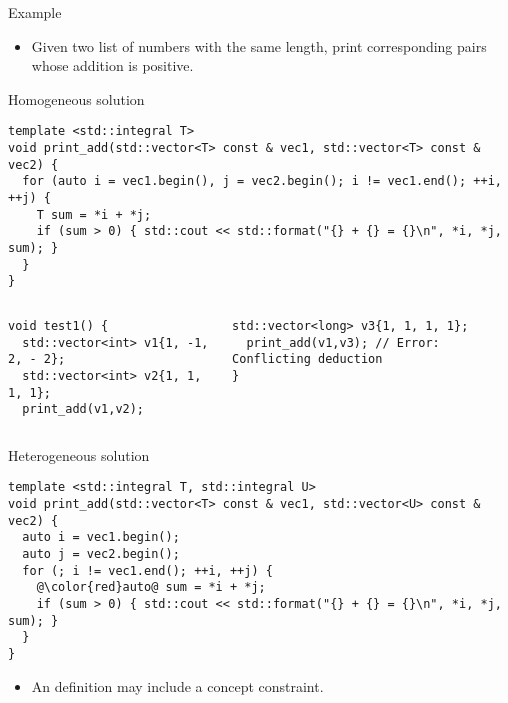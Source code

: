 \begin{frame}[t,fragile]{Example}
  \begin{itemize}
    \item Given two list of numbers with the same length, 
          print corresponding pairs whose addition is positive.
  \end{itemize}
\begin{block}{Homogeneous solution}
\begin{lstlisting}
template <std::integral T>
void print_add(std::vector<T> const & vec1, std::vector<T> const & vec2) {
  for (auto i = vec1.begin(), j = vec2.begin(); i != vec1.end(); ++i, ++j) {
    T sum = *i + *j;
    if (sum > 0) { std::cout << std::format("{} + {} = {}\n", *i, *j, sum); }
  }
}
\end{lstlisting}
\end{block}

\begin{columns}[T]
\begin{lstlisting}[basicstyle=\tiny]
void test1() {
  std::vector<int> v1{1, -1, 2, - 2};
  std::vector<int> v2{1, 1, 1, 1};
  print_add(v1,v2);
\end{lstlisting}

\begin{lstlisting}[basicstyle=\tiny]
  std::vector<long> v3{1, 1, 1, 1};
  print_add(v1,v3); // Error: Conflicting deduction
}
\end{lstlisting}
\end{columns}

\end{frame}

\begin{frame}[t,fragile]
\begin{block}{Heterogeneous solution}
\begin{lstlisting}[escapechar=@]
template <std::integral T, std::integral U>
void print_add(std::vector<T> const & vec1, std::vector<U> const & vec2) {
  auto i = vec1.begin();
  auto j = vec2.begin();
  for (; i != vec1.end(); ++i, ++j) {
    @\color{red}auto@ sum = *i + *j;
    if (sum > 0) { std::cout << std::format("{} + {} = {}\n", *i, *j, sum); }
  }
}
\end{lstlisting}
\end{block}
\begin{itemize}
  \item An  definition may include a concept constraint.
\end{itemize}
\end{frame}

